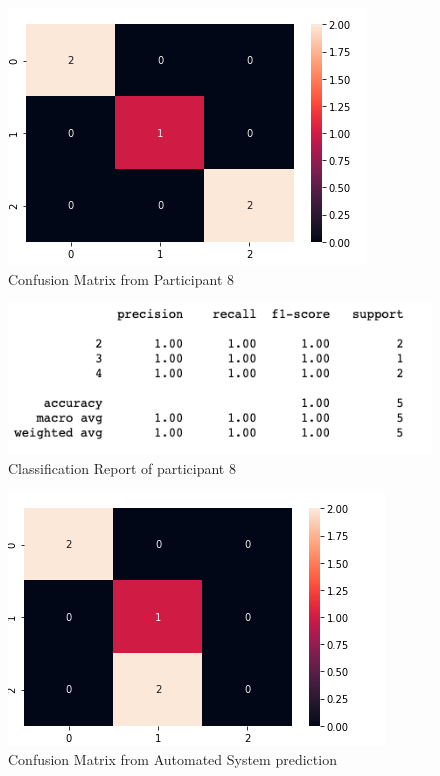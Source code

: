 \begin{figure}[!htp]
    \includegraphics[width=\textwidth]{Images/p8.png}
    \caption{Confusion Matrix from Participant 8}
    \label{fig:f11}
\end{figure}

\begin{figure}[!htp]
    \includegraphics[width=\textwidth]{Images/p8r.png}
    \caption{Classification Report of participant 8}
    \label{fig:f11}
\end{figure}

\pagebreak

\begin{figure}[!htp]
    \includegraphics[width=\textwidth]{Images/a8.png}
    \caption{Confusion Matrix from Automated System prediction}
    \label{fig:f11}
\end{figure}

